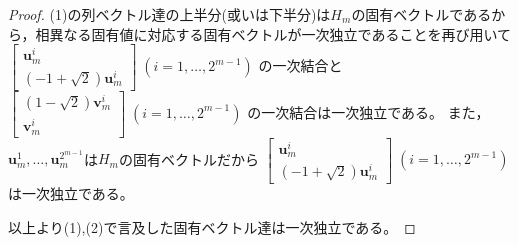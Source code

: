 \begin{proof}
                (1)の列ベクトル達の上半分(或いは下半分)は$H_m$の固有ベクトルであるから，相異なる固有値に対応する固有ベクトルが一次独立であることを再び用いて
                $
                    \begin{bmatrix}
                        \bm{u}_m^i \\
                        (-1+\sqrt{2})\bm{u}_m^i
                    \end{bmatrix}
                    \;(i=1,\dotsc,2^{m-1})
                $
                の一次結合と
                $
                    \begin{bmatrix}
                        (1-\sqrt{2})\bm{v}_m^i \\
                        \bm{v}_m^i
                    \end{bmatrix}
                    \;(i=1,\dotsc,2^{m-1})
                $
                の一次結合は一次独立である。
                また，$\bm{u}_m^1,\dotsc,\bm{u}_m^{2^{m-1}}$は$H_m$の固有ベクトルだから
                $
                    \begin{bmatrix}
                        \bm{u}_m^i \\
                        (-1+\sqrt{2})\bm{u}_m^i
                    \end{bmatrix}
                    \;(i=1,\dotsc,2^{m-1})
                $
                は一次独立である。
                \par
                以上より(1),(2)で言及した固有ベクトル達は一次独立である。
            \end{proof}
